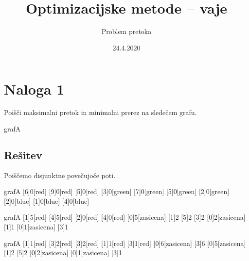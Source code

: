 \documentclass[14pt]{extarticle}
\title{Optimizacijske metode -- vaje}
\author{Problem pretoka}
\date{24.4.2020}
\begin{document}
\maketitle

\section*{Naloga 1}

Poišči maksimalni pretok in minimalni prerez na sledečem grafu.

\begin{pretok}{grafA}
\end{pretok}

\clearpage

\subsection*{Rešitev}

Poiščemo disjunktne povečujoče poti.

\begin{pretok}{grafA}
    \nicle
    [6]{0}[red]
    [9]{0}[red]
    [5]{0}[red]
    [3]{0}[green]
    [7]{0}[green]
    [5]{0}[green]
    [2]{0}[green]
    [2]{0}[blue]
    [1]{0}[blue]
    [4]{0}[blue]
\end{pretok}

\begin{pretok}{grafA}
    \nicle
    [1]{5}[red]
    [4]{5}[red]
    [2]{0}[red]
    [4]{0}[red]
    [0]{5}[zasicena]
    [1]{2}
    [5]{2}
    [3]{2}
    [0]{2}[zasicena]
    [1]{1}
    [0]{1}[zasicena]
    [3]{1}

\end{pretok}

\begin{pretok}{grafA}
    \nicle
    [1]{1}[red]
    [3]{2}[red]
    [3]{2}[red]
    [1]{1}[red]
    [3]{1}[red]
    [0]{6}[zasicena]
    [3]{6}
    [0]{5}[zasicena]
    [1]{2}
    [5]{2}
    [0]{2}[zasicena]
    [0]{1}[zasicena]
    [3]{1}

\end{pretok}
\end{document}
